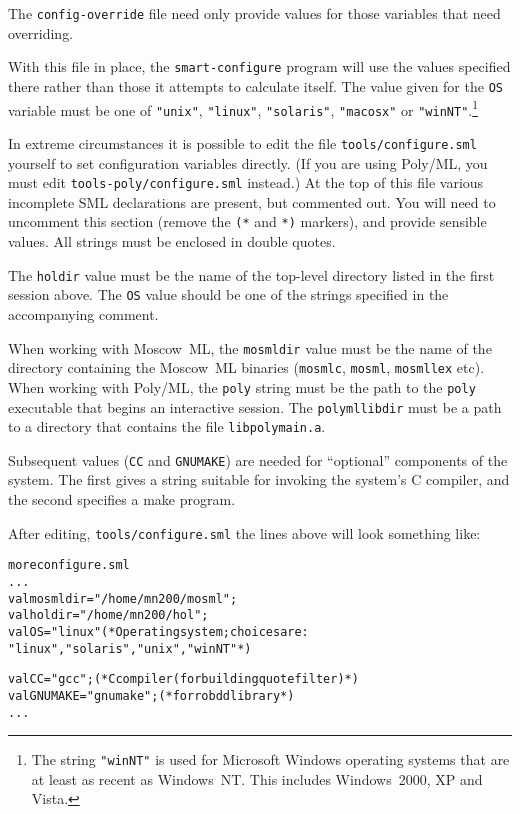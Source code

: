 The \texttt{config-override} file need only provide values for those
variables that need overriding.

With this file in place, the \texttt{smart-configure} program will use
the values specified there rather than those it attempts to calculate
itself.  The value given for the \texttt{OS} variable must be one of
\texttt{"unix"}, \texttt{"linux"}, \texttt{"solaris"},
\texttt{"macosx"} or \texttt{"winNT"}.\footnote{The string
  \texttt{"winNT"} is used for Microsoft Windows operating systems
  that are at least as recent as Windows~NT.  This includes
  Windows~2000, XP and Vista.}

In extreme circumstances it is possible to edit the file
\texttt{tools/configure.sml} yourself to set configuration variables
directly.  (If you are using Poly/ML, you must edit
\texttt{tools-poly/configure.sml} instead.) At the top of this file
various incomplete SML declarations are present, but commented out.
You will need to uncomment this section (remove the \texttt{(*} and
\texttt{*)} markers), and provide sensible values.  All strings must
be enclosed in double quotes.

The \texttt{holdir} value must be the name of the top-level directory
listed in the first session above.  The \texttt{OS} value should be
one of the strings specified in the accompanying comment.

When working with Moscow~ML, the \texttt{mosmldir} value must be the
name of the directory containing the Moscow~ML binaries
(\texttt{mosmlc}, \texttt{mosml}, \texttt{mosmllex} etc).  When
working with Poly/ML, the \texttt{poly} string must be the path to the
\texttt{poly} executable that begins an interactive \ML{} session.
The \texttt{polymllibdir} must be a path to a directory that contains
the file \texttt{libpolymain.a}.

Subsequent values (\texttt{CC} and \texttt{GNUMAKE}) are needed for
``optional'' components of the system.  The first gives a string
suitable for invoking the system's C compiler, and the second
specifies a \textsf{make} program.

After editing, \texttt{tools/configure.sml} the lines above will look
something like:

\begin{session}
\begin{alltt}
\dol more configure.sml
  ...
val mosmldir = "/home/mn200/mosml";
val holdir   = "/home/mn200/hol";
val OS       = "linux"       (* Operating system; choices are:
                                "linux", "solaris", "unix", "winNT" *)

val CC       = "gcc";     (* C compiler (for building quote filter)        *)
val GNUMAKE  = "gnumake"; (* for robdd library                             *)
  ...
\dol
\end{alltt}
\end{session}

